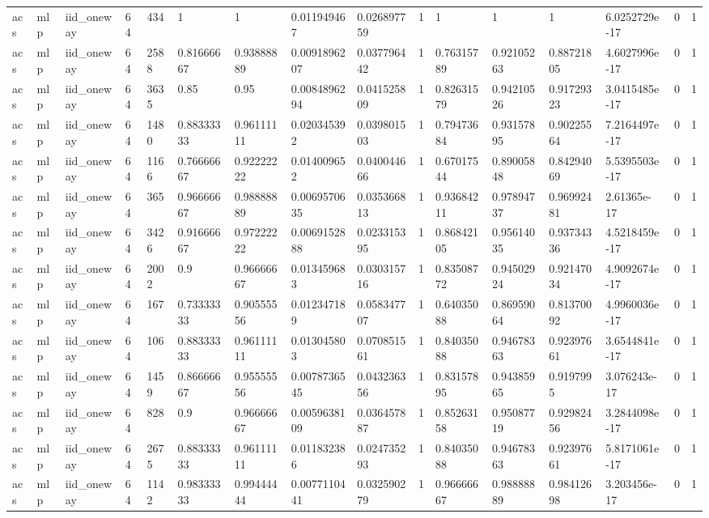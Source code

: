 \begin{tabular}{llllllllllllllll}
acs & mlp & iid\_oneway & 64 & 434 & 1 & 1 & 0.011949467 & 0.026897759 & 1 & 1 & 1 & 1 & 6.0252729e-17 & 0 & 1 \\
acs & mlp & iid\_oneway & 64 & 2588 & 0.81666667 & 0.93888889 & 0.0091896207 & 0.037796442 & 1 & 0.76315789 & 0.92105263 & 0.88721805 & 4.6027996e-17 & 0 & 1 \\
acs & mlp & iid\_oneway & 64 & 3635 & 0.85 & 0.95 & 0.0084896294 & 0.041525809 & 1 & 0.82631579 & 0.94210526 & 0.91729323 & 3.0415485e-17 & 0 & 1 \\
acs & mlp & iid\_oneway & 64 & 1480 & 0.88333333 & 0.96111111 & 0.020345392 & 0.039801503 & 1 & 0.79473684 & 0.93157895 & 0.90225564 & 7.2164497e-17 & 0 & 1 \\
acs & mlp & iid\_oneway & 64 & 1166 & 0.76666667 & 0.92222222 & 0.014009652 & 0.040044666 & 1 & 0.67017544 & 0.89005848 & 0.84294069 & 5.5395503e-17 & 0 & 1 \\
acs & mlp & iid\_oneway & 64 & 365 & 0.96666667 & 0.98888889 & 0.0069570635 & 0.035366813 & 1 & 0.93684211 & 0.97894737 & 0.96992481 & 2.61365e-17 & 0 & 1 \\
acs & mlp & iid\_oneway & 64 & 3426 & 0.91666667 & 0.97222222 & 0.0069152888 & 0.023315395 & 1 & 0.86842105 & 0.95614035 & 0.93734336 & 4.5218459e-17 & 0 & 1 \\
acs & mlp & iid\_oneway & 64 & 2002 & 0.9 & 0.96666667 & 0.013459683 & 0.030315716 & 1 & 0.83508772 & 0.94502924 & 0.92147034 & 4.9092674e-17 & 0 & 1 \\
acs & mlp & iid\_oneway & 64 & 167 & 0.73333333 & 0.90555556 & 0.012347189 & 0.058347707 & 1 & 0.64035088 & 0.86959064 & 0.81370092 & 4.9960036e-17 & 0 & 1 \\
acs & mlp & iid\_oneway & 64 & 106 & 0.88333333 & 0.96111111 & 0.013045803 & 0.070851561 & 1 & 0.84035088 & 0.94678363 & 0.92397661 & 3.6544841e-17 & 0 & 1 \\
acs & mlp & iid\_oneway & 64 & 1459 & 0.86666667 & 0.95555556 & 0.0078736545 & 0.043236356 & 1 & 0.83157895 & 0.94385965 & 0.9197995 & 3.076243e-17 & 0 & 1 \\
acs & mlp & iid\_oneway & 64 & 828 & 0.9 & 0.96666667 & 0.0059638109 & 0.036457887 & 1 & 0.85263158 & 0.95087719 & 0.92982456 & 3.2844098e-17 & 0 & 1 \\
acs & mlp & iid\_oneway & 64 & 2675 & 0.88333333 & 0.96111111 & 0.011832386 & 0.024735293 & 1 & 0.84035088 & 0.94678363 & 0.92397661 & 5.8171061e-17 & 0 & 1 \\
acs & mlp & iid\_oneway & 64 & 1142 & 0.98333333 & 0.99444444 & 0.0077110441 & 0.032590279 & 1 & 0.96666667 & 0.98888889 & 0.98412698 & 3.203456e-17 & 0 & 1 \\

\end{tabular}

